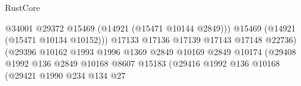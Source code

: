 \begin{lexlean}{RustCore}
\begin{coremodule}
                                                                  @34001
                                                                  @29372
                                                                  @15469
                                                                  (@14921 (@15471 @10144 @2849)))
                                                                @15469
                                                                (@14921 (@15471 @10134 @10152)))
                                                              @17133
                                                              @17136
                                                              @17139
                                                              @17143
                                                              @17148
                                                              @22736)
                                                            (@29396
                                                              @10162
                                                              @1993
                                                              @1996
                                                              @1369
                                                              @2849
                                                              @10169
                                                              @2849
                                                              @10174
                                                              (@29408
                                                                @1992
                                                                @136
                                                                @2849
                                                                @10168
                                                                @8607
                                                                @15183
                                                                (@29416
                                                                  @1992
                                                                  @136
                                                                  @10168
                                                                  (@29421
                                                                    @1990
                                                                    @234
                                                                    @134
                                                                    @27

\end{coremodule}
\end{lexlean}

